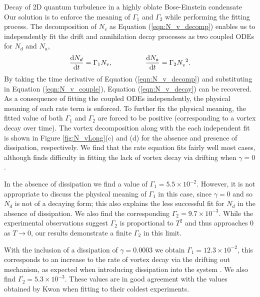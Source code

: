 \begin{chapter}{\label{cha:shin}Decay of 2D quantum turbulence in a highly oblate Bose-Einstein condensate}
Our solution is to enforce the meaning of $\Gamma_1$ and $\Gamma_2$ while performing the fitting process. The decomposition of $N_v$ as Equation (\ref{eqn:N_v_decomp}) enables us to independently fit the drift and annihilation decay processes as two coupled ODEs for $N_d$ and $N_a$,
\begin{equation}
  \frac{{\rm d}N_d}{{\rm d}t} = \Gamma_1 N_v,~~~~~~~~~~~~~~
  \frac{{\rm d}N_a}{{\rm d}t} = \Gamma_2 N_v^{~2}.
\label{eqn:N_v_couple}
\end{equation}
By taking the time derivative of Equation (\ref{eqn:N_v_decomp}) and substituting in Equation (\ref{eqn:N_v_couple}), Equation (\ref{eqn:N_v_decay}) can be recovered. As a consequence of fitting the coupled ODEs independently, the physical meaning of each rate term is enforced. To further fix the physical meaning, the fitted value of both $\Gamma_1$ and $\Gamma_2$ are forced to be positive (corresponding to a vortex decay over time). The vortex decomposition along with the each independent fit is shown in Figure \ref{fig:N_vLong}(c) and (d) for the absence and presence of dissipation, respectively. We find that the rate equation fits fairly well most cases, although finds difficulty in fitting the lack of vortex decay via drifting when $\gamma=0$.

In the absence of dissipation we find a value of $\Gamma_{1} = 5.5 \times 10^{-2}$. However, it is not appropriate to discuss the physical meaning of $\Gamma_1$ in this case, since $\gamma=0$ and so $N_d$ is not of a decaying form; this also explains the less successful fit for $N_d$ in the absence of dissipation. We also find the corresponding $\Gamma_{2} = 9.7 \times 10^{-3}$. While the experimental observations \cite{kwon_moon_14} suggest $\Gamma_2$ is proportional to $T^2$ and thus approaches 0 as $T\rightarrow0$, our results demonstrate a finite $\Gamma_2$ in this limit.

With the inclusion of a dissipation of $\gamma=0.0003$ we obtain $\Gamma_{1} = 12.3 \times 10^{-2}$, this corresponds to an increase to the rate of vortex decay via the drifting out mechanism, as expected when introducing dissipation into the system \citep{allen_zaremba_13}. We also find $\Gamma_{2} = 5.3 \times 10^{-3}$. These values are in good agreement with the values obtained by Kwon \etal when fitting to their coldest experiments. 


\end{chapter}
